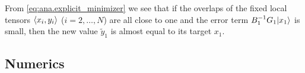 From \cref{eq:ana.explicit_minimizer} we see that if the overlaps of the fixed local tensors $\braket{x_i, y_i}$ ($i=2,\ldots,N$) are all close to one and the error term $B_1^{-1} G_1 \ket{x_1}$ is small, then the new value $\tilde y_1$ is almost equal to its target $x_1$.



\subsection{Numerics}%

